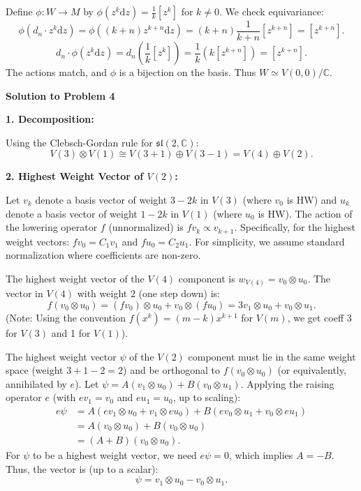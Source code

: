 \documentclass{article}
\newcommand{\C}{\mathbb{C}}
\newcommand{\slC}{\mathfrak{sl}(2, \mathbb{C})}
\newcommand{\der}{\mathrm{d}}
\begin{document}
Define $\phi: W \to M$ by $\phi(z^k \der z) = \frac{1}{k} [z^k]$ for $k \neq 0$. We check equivariance:
\[ \phi(d_n \cdot z^k \der z) = \phi((k+n) z^{k+n} \der z) = (k+n) \frac{1}{k+n} [z^{k+n}] = [z^{k+n}]. \]
\[ d_n \cdot \phi(z^k \der z) = d_n \left( \frac{1}{k} [z^k] \right) = \frac{1}{k} (k [z^{k+n}]) = [z^{k+n}]. \]
The actions match, and $\phi$ is a bijection on the basis. Thus $W \simeq V(0,0)/\C$.

\hrulefill

\textbf{Solution to Problem 4}

\textbf{1. Decomposition:}

Using the Clebsch-Gordan rule for $\slC$:
\[ V(3) \otimes V(1) \cong V(3+1) \oplus V(3-1) = V(4) \oplus V(2). \]

\vspace{0.5cm}

\textbf{2. Highest Weight Vector of $V(2)$:}

Let $v_k$ denote a basis vector of weight $3-2k$ in $V(3)$ (where $v_0$ is HW) and $u_k$ denote a basis vector of weight $1-2k$ in $V(1)$ (where $u_0$ is HW).
The action of the lowering operator $f$ (unnormalized) is $f v_k \propto v_{k+1}$. Specifically, for the highest weight vectors: $f v_0 = C_1 v_1$ and $f u_0 = C_2 u_1$. For simplicity, we assume standard normalization where coefficients are non-zero.

The highest weight vector of the $V(4)$ component is $w_{V(4)} = v_0 \otimes u_0$.
The vector in $V(4)$ with weight $2$ (one step down) is:
\[ f(v_0 \otimes u_0) = (f v_0) \otimes u_0 + v_0 \otimes (f u_0) = 3 v_1 \otimes u_0 + v_0 \otimes u_1. \]
(Note: Using the convention $f(x^k) = (m-k)x^{k+1}$ for $V(m)$, we get coeff 3 for $V(3)$ and 1 for $V(1)$).

The highest weight vector $\psi$ of the $V(2)$ component must lie in the same weight space (weight $3+1-2=2$) and be orthogonal to $f(v_0 \otimes u_0)$ (or equivalently, annihilated by $e$).
Let $\psi = A (v_1 \otimes u_0) + B (v_0 \otimes u_1)$.
Applying the raising operator $e$ (with $e v_1 = v_0$ and $e u_1 = u_0$, up to scaling):
\begin{align*}
    e \psi &= A (e v_1 \otimes u_0 + v_1 \otimes e u_0) + B (e v_0 \otimes u_1 + v_0 \otimes e u_1) \\
    &= A (v_0 \otimes u_0) + B (v_0 \otimes u_0) \\
    &= (A+B) (v_0 \otimes u_0).
\end{align*}
For $\psi$ to be a highest weight vector, we need $e \psi = 0$, which implies $A = -B$.
Thus, the vector is (up to a scalar):
\[ \psi = v_1 \otimes u_0 - v_0 \otimes u_1. \]
\end{document}
